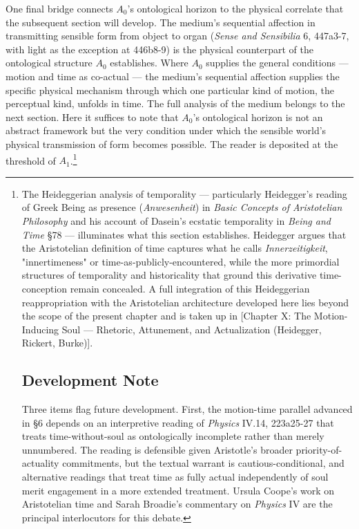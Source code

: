 \documentclass[12pt]{article}
\begin{document}
One final bridge connects $A_0$'s ontological horizon to the physical correlate that the subsequent section will develop. The medium's sequential affection in transmitting sensible form from object to organ (\textit{Sense and Sensibilia} 6, 447a3-7, with light as the exception at 446b8-9) is the physical counterpart of the ontological structure $A_0$ establishes. Where $A_0$ supplies the general conditions --- motion and time as co-actual --- the medium's sequential affection supplies the specific physical mechanism through which one particular kind of motion, the perceptual kind, unfolds in time. The full analysis of the medium belongs to the next section. Here it suffices to note that $A_0$'s ontological horizon is not an abstract framework but the very condition under which the sensible world's physical transmission of form becomes possible. The reader is deposited at the threshold of $A_1$.\footnote{The Heideggerian analysis of temporality --- particularly Heidegger's reading of Greek Being as presence (\textit{Anwesenheit}) in \textit{Basic Concepts of Aristotelian Philosophy} and his account of Dasein's ecstatic temporality in \textit{Being and Time} §78 --- illuminates what this section establishes. Heidegger argues that the Aristotelian definition of time captures what he calls \textit{Innerzeitigkeit}, "innertimeness" or time-as-publicly-encountered, while the more primordial structures of temporality and historicality that ground this derivative time-conception remain concealed. A full integration of this Heideggerian reappropriation with the Aristotelian architecture developed here lies beyond the scope of the present chapter and is taken up in [Chapter X: The Motion-Inducing Soul --- Rhetoric, Attunement, and Actualization (Heidegger, Rickert, Burke)].

\subsection*{Development Note}

Three items flag future development. First, the motion-time parallel advanced in §6 depends on an interpretive reading of \textit{Physics} IV.14, 223a25-27 that treats time-without-soul as ontologically incomplete rather than merely unnumbered. The reading is defensible given Aristotle's broader priority-of-actuality commitments, but the textual warrant is cautious-conditional, and alternative readings that treat time as fully actual independently of soul merit engagement in a more extended treatment. Ursula Coope's work on Aristotelian time and Sarah Broadie's commentary on \textit{Physics} IV are the principal interlocutors for this debate.

}
\end{document}

